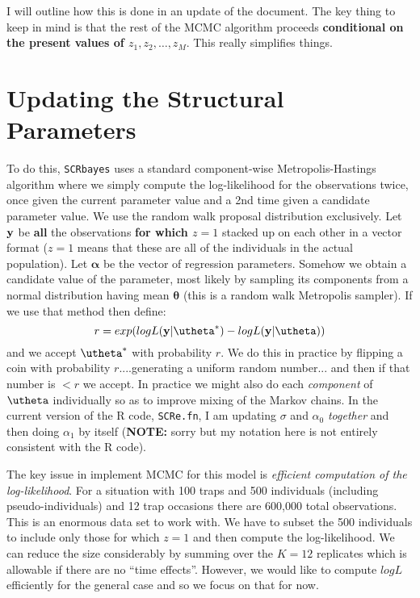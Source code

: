 \documentclass[12pt]{article}
\begin{document}
I will outline how this is done in an update of the document.  The key
thing to keep in mind is that the rest of the MCMC algorithm proceeds
{\bf conditional on the present values of $z_{1},z_{2},\ldots,z_{M}$}.
This really simplifies things.


\section{Updating the Structural Parameters}

To do this, \mbox{\tt SCRbayes} 
uses a standard component-wise Metropolis-Hastings
algorithm where we simply compute the log-likelihood for the
observations twice, once given the current parameter value and a 2nd
time given a candidate parameter value. We use the random walk proposal
distribution exclusively.  Let ${\bf y}$ be {\bf all} the observations
{\bf for which $z=1$} stacked up on each other in a vector format
($z=1$ means that these are all of the individuals in the actual
population).  Let ${\bm \alpha}$ be the vector of regression
parameters. Somehow we obtain a candidate value of the parameter, most
likely by sampling its components from a normal distribution having
mean ${\bm \theta}$ (this is a random walk Metropolis sampler).  If we
use that method then define:
\[
r = exp( logL({\bf y}|{\utheta}^{*}) - logL({\bf y}|{\utheta}))
\]
and we accept ${\utheta}^{*}$ with probability $r$. We do this in
practice by flipping a coin with probability $r$....generating a
uniform random number... and then if that number is $< r$ we accept.
In practice we might also do each {\it component} of ${\bf \utheta}$
individually so as to improve mixing of the Markov chains. In the
current version of the R code, \mbox{\tt SCRe.fn}, I am updating
$\sigma$ and $\alpha_{0}$ {\it together} and then doing $\alpha_{1}$ by
itself ({\bf NOTE:} sorry but my notation here is not entirely
consistent with the R code).


The key issue in implement MCMC for this model is {\it efficient
  computation of the log-likelihood}.  For a situation with 100 traps
and 500 individuals (including pseudo-individuals) and 12 trap
occasions there are 600,000 total observations. This is an enormous
data set to work with.  We have to subset the 500 individuals to
include only those for which $z=1$ and then compute the
log-likelihood.  We can reduce the size considerably by summing over
the $K=12$ replicates which is allowable if there are no ``time
effects''. However, we would like to compute $logL$ efficiently for
the general case and so we focus on that for now.
\end{document}
